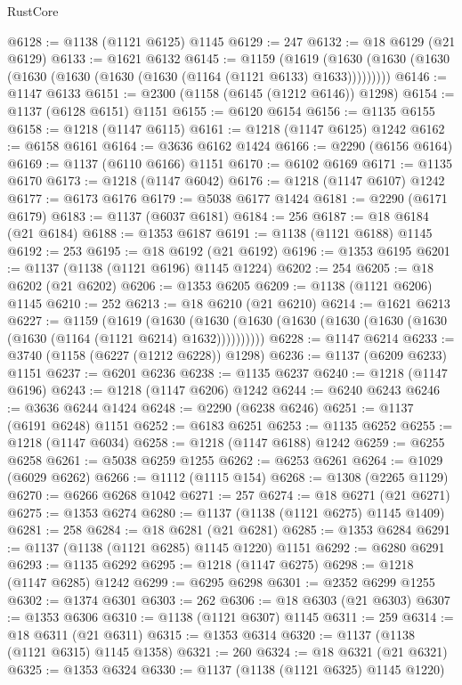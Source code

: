 \begin{lexlean}{RustCore}
\begin{coremodule}
@6128 := @1138 (@1121 @6125) @1145
@6129 := 247
@6132 := @18 @6129 (@21 @6129)
@6133 := @1621 @6132
@6145 := @1159
    (@1619 (@1630 (@1630 (@1630 (@1630 (@1630 (@1630 (@1630 (@1164 (@1121 @6133) @1633)))))))))
@6146 := @1147 @6133
@6151 := @2300 (@1158 (@6145 (@1212 @6146)) @1298)
@6154 := @1137 (@6128 @6151) @1151
@6155 := @6120 @6154
@6156 := @1135 @6155
@6158 := @1218 (@1147 @6115)
@6161 := @1218 (@1147 @6125) @1242
@6162 := @6158 @6161
@6164 := @3636 @6162 @1424
@6166 := @2290 (@6156 @6164)
@6169 := @1137 (@6110 @6166) @1151
@6170 := @6102 @6169
@6171 := @1135 @6170
@6173 := @1218 (@1147 @6042)
@6176 := @1218 (@1147 @6107) @1242
@6177 := @6173 @6176
@6179 := @5038 @6177 @1424
@6181 := @2290 (@6171 @6179)
@6183 := @1137 (@6037 @6181)
@6184 := 256
@6187 := @18 @6184 (@21 @6184)
@6188 := @1353 @6187
@6191 := @1138 (@1121 @6188) @1145
@6192 := 253
@6195 := @18 @6192 (@21 @6192)
@6196 := @1353 @6195
@6201 := @1137 (@1138 (@1121 @6196) @1145 @1224)
@6202 := 254
@6205 := @18 @6202 (@21 @6202)
@6206 := @1353 @6205
@6209 := @1138 (@1121 @6206) @1145
@6210 := 252
@6213 := @18 @6210 (@21 @6210)
@6214 := @1621 @6213
@6227 := @1159
    (@1619
      (@1630 (@1630 (@1630 (@1630 (@1630 (@1630 (@1630 (@1630 (@1164 (@1121 @6214) @1632))))))))))
@6228 := @1147 @6214
@6233 := @3740 (@1158 (@6227 (@1212 @6228)) @1298)
@6236 := @1137 (@6209 @6233) @1151
@6237 := @6201 @6236
@6238 := @1135 @6237
@6240 := @1218 (@1147 @6196)
@6243 := @1218 (@1147 @6206) @1242
@6244 := @6240 @6243
@6246 := @3636 @6244 @1424
@6248 := @2290 (@6238 @6246)
@6251 := @1137 (@6191 @6248) @1151
@6252 := @6183 @6251
@6253 := @1135 @6252
@6255 := @1218 (@1147 @6034)
@6258 := @1218 (@1147 @6188) @1242
@6259 := @6255 @6258
@6261 := @5038 @6259 @1255
@6262 := @6253 @6261
@6264 := @1029 (@6029 @6262)
@6266 := @1112 (@1115 @154)
@6268 := @1308 (@2265 @1129)
@6270 := @6266 @6268 @1042
@6271 := 257
@6274 := @18 @6271 (@21 @6271)
@6275 := @1353 @6274
@6280 := @1137 (@1138 (@1121 @6275) @1145 @1409)
@6281 := 258
@6284 := @18 @6281 (@21 @6281)
@6285 := @1353 @6284
@6291 := @1137 (@1138 (@1121 @6285) @1145 @1220) @1151
@6292 := @6280 @6291
@6293 := @1135 @6292
@6295 := @1218 (@1147 @6275)
@6298 := @1218 (@1147 @6285) @1242
@6299 := @6295 @6298
@6301 := @2352 @6299 @1255
@6302 := @1374 @6301
@6303 := 262
@6306 := @18 @6303 (@21 @6303)
@6307 := @1353 @6306
@6310 := @1138 (@1121 @6307) @1145
@6311 := 259
@6314 := @18 @6311 (@21 @6311)
@6315 := @1353 @6314
@6320 := @1137 (@1138 (@1121 @6315) @1145 @1358)
@6321 := 260
@6324 := @18 @6321 (@21 @6321)
@6325 := @1353 @6324
@6330 := @1137 (@1138 (@1121 @6325) @1145 @1220)

\end{coremodule}
\end{lexlean}

